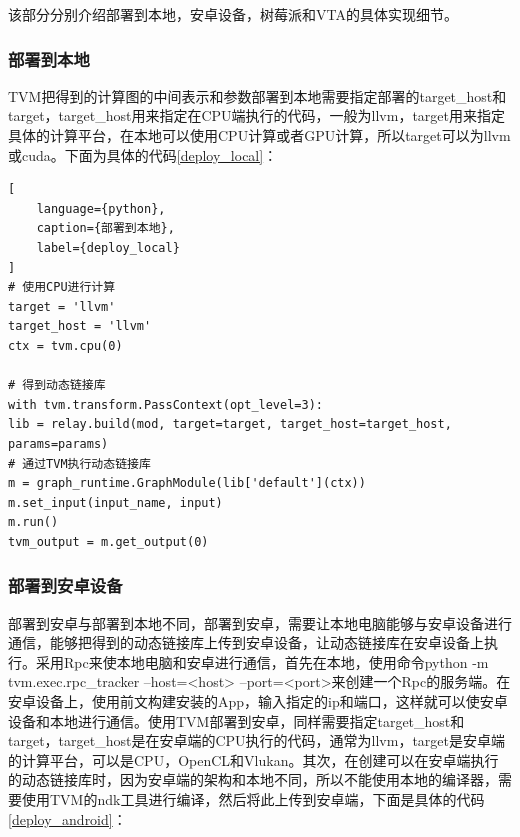 该部分分别介绍部署到本地，安卓设备，树莓派和VTA的具体实现细节。


\subsubsection{部署到本地}

TVM把得到的计算图的中间表示和参数部署到本地需要指定部署的target\_host和target，target\_host用来指定在CPU端执行的代码，一般为llvm，target用来指定具体的计算平台，在本地可以使用CPU计算或者GPU计算，所以target可以为llvm或cuda。下面为具体的代码\ref{deploy_local}：

\begin{lstlisting}[
    language={python},
    caption={部署到本地},
    label={deploy_local}
]
# 使用CPU进行计算
target = 'llvm'
target_host = 'llvm'
ctx = tvm.cpu(0)

# 得到动态链接库
with tvm.transform.PassContext(opt_level=3):
lib = relay.build(mod, target=target, target_host=target_host, params=params)
# 通过TVM执行动态链接库
m = graph_runtime.GraphModule(lib['default'](ctx))
m.set_input(input_name, input)
m.run()
tvm_output = m.get_output(0)
\end{lstlisting}


\subsubsection{部署到安卓设备}

部署到安卓与部署到本地不同，部署到安卓，需要让本地电脑能够与安卓设备进行通信，能够把得到的动态链接库上传到安卓设备，让动态链接库在安卓设备上执行。采用Rpc来使本地电脑和安卓进行通信，首先在本地，使用命令python -m tvm.exec.rpc\_tracker --host=<host> --port=<port>来创建一个Rpc的服务端。在安卓设备上，使用前文构建安装的App，输入指定的ip和端口，这样就可以使安卓设备和本地进行通信。使用TVM部署到安卓，同样需要指定target\_host和target，target\_host是在安卓端的CPU执行的代码，通常为llvm，target是安卓端的计算平台，可以是CPU，OpenCL和Vlukan。其次，在创建可以在安卓端执行的动态链接库时，因为安卓端的架构和本地不同，所以不能使用本地的编译器，需要使用TVM的ndk工具进行编译，然后将此上传到安卓端，下面是具体的代码\ref{deploy_android}：


